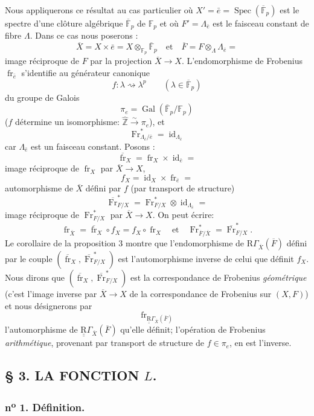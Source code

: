 \documentclass[11pt]{article}
\DeclareMathOperator{\Spec}{Spec}
\providecommand{\Gal}{\operatorname{Gal}}
\providecommand{\id}{\operatorname{id}}
\providecommand{\id}{\operatorname{id}}
\providecommand{\id}{\operatorname{id}}
\providecommand{\id}{\operatorname{id}}
\providecommand{\Spec}{\operatorname{Spec}}
\providecommand{\Spec}{\operatorname{Spec}}
\providecommand{\id}{\operatorname{id}}
\providecommand{\Spec}{\operatorname{Spec}}
\providecommand{\fr}{\operatorname{fr}}
\providecommand{\Fr}{\operatorname{Fr}}
\providecommand{\Fr}{\operatorname{Fr}}
\providecommand{\fr}{\operatorname{fr}}
\providecommand{\Spec}{\operatorname{Spec}}
\providecommand{\id}{\operatorname{id}}
\providecommand{\Gal}{\operatorname{Gal}}
\begin{document}
Nous appliquerons ce résultat au cas particulier où $X'=\bar e=\Spec(\overline{\mathbb F}_p)$ est le spectre d'une clôture algébrique $\overline{\mathbb F}_p$ de $\mathbb F_p$ et où $F'=\Lambda_{\bar e}$ est le faisceau constant de fibre $\Lambda$. Dans ce cas nous poserons :
\[
\overline X=X\times\bar e=X\otimes_{\mathbb F_p}\overline{\mathbb F}_p\quad\text{et}\quad
\overline F=F\otimes_\Lambda\Lambda_{\bar e}=
\]
image réciproque de $F$ par la projection $\overline X\to X$. L'endomorphisme de Frobenius $\fr_{\bar e}$ s'identifie au générateur canonique
\[
f:\lambda\rightsquigarrow\lambda^p\qquad(\lambda\in\overline{\mathbb F}_p)
\]
du groupe de Galois
\[
\pi_e=\Gal(\overline{\mathbb F}_p/\mathbb F_p)
\]
($f$ détermine un isomorphisme: $\widehat{\mathbb Z}\xrightarrow{\sim}\pi_e$), et
\[
\Fr^*_{\Lambda_{\bar e}/\bar e}=\id_{\Lambda_{\bar e}}
\]
car $\Lambda_{\bar e}$ est un faisceau constant. Posons :
\[
\overline{\fr}_X=\fr_X\times\id_{\bar e}=
\]
image réciproque de $\fr_X$ par $\overline X\to X$,
\[
f_X=\id_X\times\fr_{\bar e}=
\]
automorphisme de $\overline X$ défini par $f$ (par transport de structure)
\[
\overline{\Fr}^*_{F/X}=\Fr^*_{F/X}\otimes\id_{\Lambda_{\bar e}}=
\]
image réciproque de $\Fr^*_{F/X}$ par $\overline X\to X$. On peut écrire:
\[
\fr_{\overline X}=\overline{\fr}_X\circ f_X=f_X\circ\fr_X\quad\text{et}\quad
\Fr^*_{\overline F/\overline X}=\overline{\Fr}^*_{F/X}.
\]
Le corollaire de la proposition 3 montre que l'endomorphisme de $\mathrm{R}\Gamma_{\overline X}(\overline F)$ défini par le couple $(\overline{\fr}_X,\overline{\Fr}^*_{F/X})$ est l'automorphisme inverse de celui que définit $f_X$. Nous dirons que $(\overline{\fr}_X,\overline{\Fr}^*_{F/X})$ est la correspondance de Frobenius \emph{géométrique} (c'est l'image inverse par $\overline X\to X$ de la correspondance de Frobenius sur $(X,F)$) et nous désignerons par
\[
\fr_{\underline{\underline{\mathrm{R}}}\Gamma_{\overline X}(\overline F)}
\]
l'automorphisme de $\underline{\underline{\mathrm{R}}}\Gamma_{\overline X}(\overline F)$ qu'elle définit; l'opération de Frobenius \emph{arithmétique}, provenant par transport de structure de $f\in\pi_e$, en est l'inverse.

\subsection*{§ 3. LA FONCTION $L$.}

\subsubsection*{n\textsuperscript{o} 1. Définition.}
\end{document}
